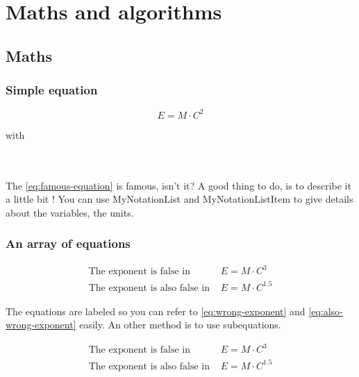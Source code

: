 \section{Maths and algorithms}
\label{sec:mathandalgo}

\lipsum[149]

\subsection{Maths}

\lipsum[143]

\subsubsection{Simple equation}

\begin{equation}\label{eq:famous-equation}
    E= M \cdot C^2
\end{equation}

\begin{MyNotationList}{with}
    \\
    \\
    \\
\end{MyNotationList}

The \ref{eq:famous-equation} is famous, isn't it? A good thing to do, is to describe it a little bit ! You can use MyNotationList and MyNotationListItem to give details about the variables, the units.

\subsubsection{An array of equations}

\begin{eqnarray}
   \text{The exponent is false in } & E = M \cdot C^3 
   \label{eq:wrong-exponent} \\
   \text{The exponent is also false in } & E = M \cdot C^{1.5}
   \label{eq:also-wrong-exponent}
\end{eqnarray}

The equations are labeled so you can refer to \ref{eq:wrong-exponent} and \ref{eq:also-wrong-exponent} easily. An other method is to use subequations.

\begin{subequations}
    \begin{align}
        \text{The exponent is false in } & E = M \cdot C^3  \label{eq:subequation_a} \\
        \text{The exponent is also false in } & E = M \cdot C^{1.5} \label{eq:subequation_b}
    \end{align}
\end{subequations}

